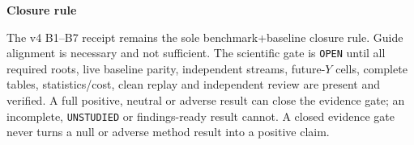 \documentclass[10pt,a4paper]{article}
\newcommand{\lead}[1]{\vspace{3pt}\textbf{#1}\par}
\begin{document}
\lead{Closure rule}
The v4 B1--B7 receipt remains the sole benchmark+baseline closure rule. Guide alignment
is necessary and not sufficient. The scientific gate is \texttt{OPEN} until all required
roots, live baseline parity, independent streams, future-$Y$ cells, complete tables,
statistics/cost, clean replay and independent review are present and verified. A full
positive, neutral or adverse result can close the evidence gate; an incomplete,
\texttt{UNSTUDIED} or findings-ready result cannot. A closed evidence gate never turns
a null or adverse method result into a positive claim.
\end{document}
